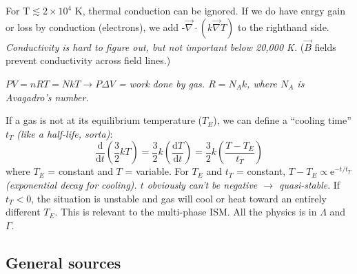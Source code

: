\documentclass[11pt]{article}
\newcommand{\mar}[1]{\hspace{0pt}\marginpar{-\textcolor{black}{#1}-}}
\newcommand{\mynotes}[1]{{\fontfamily{cmss}\selectfont \textit{#1}}}
\begin{document}
For T$\lesssim2\times10^{4}$ K, thermal conduction can be ignored.
If we do have enrgy gain or loss by conduction (electrons), we add
-$\vec{\nabla}\cdot\left(k\vec{\nabla}T\right)$ to the righthand side.
\mynotes{Conductivity is hard to figure out, but not important below 20,000 K.}
($\vec{B}$ fields prevent conductivity across field lines.)

\mynotes{ $PV = nRT = NkT \rightarrow P\Delta{V} $ = work done by gas.
$R = N_{A}k$, where $N_{A}$ is Avagadro's number.}

If a gas is not at its equilibrium temperature ($T_{E}$), we can
define a ``cooling time'' $t_{T}$ \mynotes{(like a half-life, sorta)}:
\[
    \frac{\mathrm{d}}{\mathrm{d}t}\left(\frac{3}{2}kT\right) =
    \frac{3}{2}k\left(\frac{\mathrm{d}T}{\mathrm{d}t} \right) =
    \frac{3}{2}k\left(\frac{T-T_{E}}{t_{T}}\right)
    \]
where $T_{E}$ = constant and $T$ = variable. For $T_{E}$ and $t_{T}$
= constant, $T-T_{E} \propto \mathrm{e}^{-t/t_{T}}$
\mynotes{(exponential decay for cooling). $t$ obviously can't be negative
$\rightarrow$ quasi-stable}.
\mar{152}If $t_{T} < 0$, the situation is unstable and gas will cool or heat
toward an entirely different $T_{E}$. This is relevant
to the multi-phase ISM. All the physics is in $\Lambda$ and $\Gamma$.

\subsection{General sources}
\end{document}
